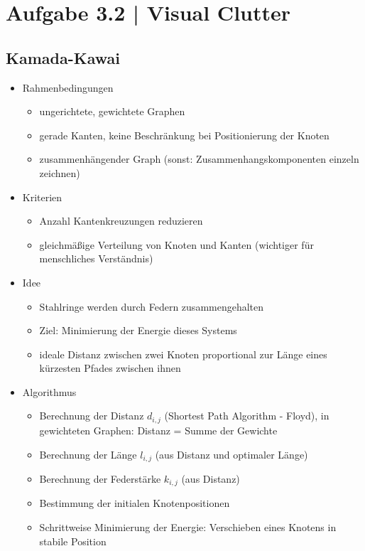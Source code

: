 \documentclass[a4paper,12pt,ngerman]{scrartcl}
\begin{document}
\section{Aufgabe 3.2 | Visual Clutter}
\subsection*{Kamada-Kawai}
\begin{itemize}
    \item Rahmenbedingungen
    \begin{itemize}
        \item ungerichtete, gewichtete Graphen
        \item gerade Kanten, keine Beschränkung bei Positionierung der Knoten
        \item zusammenhängender Graph (sonst: Zusammenhangskomponenten einzeln zeichnen)
    \end{itemize}
    \item Kriterien
    \begin{itemize}
        \item Anzahl Kantenkreuzungen reduzieren
        \item gleichmäßige Verteilung von Knoten und Kanten (wichtiger für menschliches Verständnis)
    \end{itemize}
    \item Idee
    \begin{itemize}
        \item Stahlringe werden durch Federn zusammengehalten
        \item Ziel: Minimierung der Energie dieses Systems
        \item ideale Distanz zwischen zwei Knoten proportional zur Länge eines kürzesten Pfades zwischen ihnen
    \end{itemize}
    \item Algorithmus
    \begin{itemize}
        \item Berechnung der Distanz $d_{i,j}$  (Shortest Path Algorithm - Floyd), in gewichteten Graphen: Distanz = Summe der Gewichte
        \item Berechnung der Länge $l_{i,j}$ (aus Distanz und optimaler Länge)
        \item Berechnung der Federstärke $k_{i,j}$ (aus Distanz)
        \item Bestimmung der initialen Knotenpositionen
        \item Schrittweise Minimierung der Energie: Verschieben eines Knotens in stabile Position
    \end{itemize}


\end{itemize}
\end{document}
